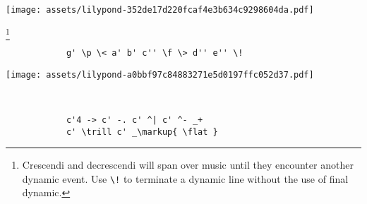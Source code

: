 \documentclass[a4paper]{tufte-handout}
\newenvironment{abjadbookoutput}{}{}
\begin{document}
\begin{description}
\begin{multicols}{2}
            \begin{abjadbookoutput}
            \noindent\texttt{[image: assets/lilypond-352de17d220fcaf4e3b634c9298604da.pdf]}
            \end{abjadbookoutput}

        \end{multicols}

    \item[Dynamics, hairpins, etc.:]\footnote{%
        Crescendi and decrescendi will span over music until they encounter
        another dynamic event. Use \texttt{\textbackslash!} to terminate a
        dynamic line without the use of final dynamic.}
        \hfill \vspace{-\baselineskip} \\
        \begin{multicols}{2}

            \begin{verbatim}
            g' \p \< a' b' c'' \f \> d'' e'' \!
            \end{verbatim}

            \begin{comment}
            <lilypond>[stylesheet=stylesheet-minimal.ily]
            { g' \p \< a' b' c'' \f \> d'' e'' \! }
            </lilypond>
            \end{comment}

            \begin{abjadbookoutput}
            \noindent\texttt{[image: assets/lilypond-a0bbf97c84883271e5d0197ffc052d37.pdf]}
            \end{abjadbookoutput}

        \end{multicols}

    \item[Articulations and text markup:]
        \hfill \vspace{-\baselineskip} \\
        \begin{multicols}{2}

            \begin{verbatim}
            c'4 -> c' -. c' ^| c' ^- _+
            c' \trill c' _\markup{ \flat }
            \end{verbatim}

            \begin{comment}
            <lilypond>[stylesheet=stylesheet-minimal.ily]
            {
                c'4 -> c' -. c' ^! c' ^- _+
                c' \trill c' _\markup{ \flat }
            }
            </lilypond>
            \end{comment}


\end{multicols}
\end{description}
\end{document}
